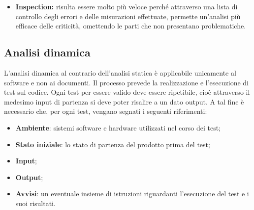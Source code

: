 \begin{itemize}
\begin{itemize}
\item \textbf{Inspection:} risulta essere molto più veloce perché attraverso una lista di controllo degli
errori e delle misurazioni effettuate, permette un'analisi più efficace delle
criticità, omettendo le parti che non presentano problematiche.
\end{itemize}
	
\subsection{Analisi dinamica}	L'analisi dinamica al contrario dell'analisi statica è applicabile unicamente
al software e non ai documenti. Il processo prevede la realizzazione e l'esecuzione
di test sul codice. Ogni test per essere valido deve essere ripetibile,
cioè attraverso il medesimo input di partenza si deve poter risalire a un dato
output. A tal fine è necessario che, per ogni test, vengano segnati i seguenti
riferimenti:

\begin{itemize}
	\item \textbf{Ambiente}: sistemi software e hardware utilizzati nel corso dei
	test;
	\item \textbf{Stato iniziale}: lo stato di partenza del prodotto prima del test;
	\item \textbf{Input};
	\item \textbf{Output};
	\item \textbf{Avvisi}: un eventuale insieme di istruzioni riguardanti l'esecuzione del
test e i suoi risultati.

\end{itemize}


\end{itemize}
